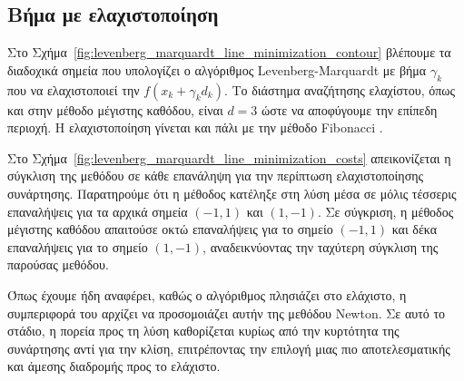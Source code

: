 \documentclass[a4paper,12pt]{article}
\begin{document}
\subsection*{Βήμα με ελαχιστοποίηση}
Στο Σχήμα~\ref{fig:levenberg_marquardt_line_minimization_contour} βλέπουμε τα διαδοχικά σημεία που υπολογίζει
ο αλγόριθμος  Levenberg-Marquardt  με βήμα $\gamma_k$ που να
ελαχιστοποιεί την $f(x_k + \gamma_k d_k)$. Το διάστημα αναζήτησης ελαχίστου, όπως και στην μέθοδο μέγιστης καθόδου,
είναι $d=3$ ώστε να αποφύγουμε την επίπεδη περιοχή. Η ελαχιστοποίηση γίνεται και πάλι με την μέθοδο
 Fibonacci .

Στο Σχήμα~\ref{fig:levenberg_marquardt_line_minimization_costs} απεικονίζεται η σύγκλιση της μεθόδου σε κάθε επανάληψη 
για την περίπτωση ελαχιστοποίησης συνάρτησης. Παρατηρούμε ότι η μέθοδος κατέληξε στη λύση μέσα σε μόλις τέσσερις 
επαναλήψεις για τα αρχικά σημεία $(-1, 1)$ και $(1, -1)$. Σε σύγκριση, η μέθοδος μέγιστης καθόδου απαιτούσε οκτώ 
επαναλήψεις για το σημείο $(-1, 1)$ και δέκα επαναλήψεις για το σημείο $(1, -1)$, αναδεικνύοντας την ταχύτερη 
σύγκλιση της παρούσας μεθόδου.

Όπως έχουμε ήδη αναφέρει, καθώς ο αλγόριθμος πλησιάζει στο ελάχιστο, η συμπεριφορά του αρχίζει να προσομοιάζει αυτήν της
μεθόδου Newton. Σε αυτό το στάδιο, η πορεία προς τη λύση καθορίζεται
κυρίως από την κυρτότητα της συνάρτησης αντί για την κλίση, επιτρέποντας την επιλογή μιας πιο αποτελεσματικής και άμεσης
διαδρομής προς το ελάχιστο.
\end{document}
